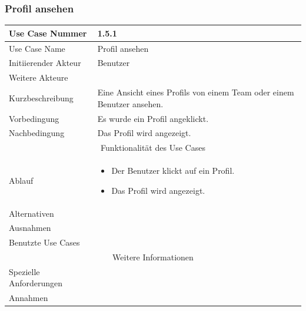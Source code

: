 \documentclass[10pt,a4paper]{article}
\begin{document}
\subsubsection{Profil ansehen}
	\begin{tabular}{|l|p{.5\linewidth}|}
	\hline Use Case Nummer & 1.5.1 \\ 
	\hline Use Case Name & Profil ansehen \\ 
	\hline Initiierender Akteur & Benutzer \\
	\hline Weitere Akteure &  \\
	\hline Kurzbeschreibung & Eine Ansicht eines Profils von einem Team oder einem Benutzer ansehen. \\
	\hline Vorbedingung & Es wurde ein Profil angeklickt. \\
	\hline Nachbedingung & Das Profil wird angezeigt. \\
	\hline \multicolumn{2}{|c|}{Funktionalität des Use Cases}\\
	\hline Ablauf & \begin{itemize}
		\item Der Benutzer klickt auf ein Profil.
		\item Das Profil wird angezeigt.
	\end{itemize} \\
	\hline Alternativen &  \\
	\hline Ausnahmen &  \\
	\hline Benutzte Use Cases &  \\
	\hline \multicolumn{2}{|c|}{Weitere Informationen} \\
	\hline Spezielle Anforderungen &  \\
	\hline Annahmen &  \\
	\hline
	\end{tabular}
\end{document}
